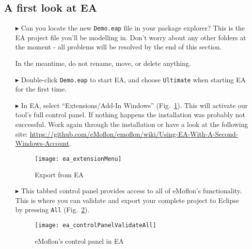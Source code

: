 \clearpage
\genHeader

\subsection{A first look at EA}

\begin{itemize}
\FloatBarrier
\hypertarget{simpleDemo vis}{}
\item[$\blacktriangleright$] Can you locate the new \texttt{Demo.eap} file in your package explorer? This is the EA project file you'll be
modelling in. Don't worry about any other folders at the moment - all problems will be resolved by the end of this section.

In the meantime, do not rename, move, or delete anything.

\item[$\blacktriangleright$] Double-click \texttt{Demo.eap} to start EA, and choose \texttt{Ultimate} when starting EA for the first time.

\item[$\blacktriangleright$] In EA, select ``Extensions/Add-In Windows'' (Fig.~\ref{ea:validate_dropdown}). This will activate our tool's full
control panel. If nothing happens the installation was probably not successful. Work again through the installation or have a look at the following site:
\newline
\href{https://github.com/eMoflon/emoflon/wiki/Using-EA-With-A-Second-Windows-Account}{https://github.com/eMoflon/emoflon/wiki/Using-EA-With-A-Second-Windows-Account}.

\vspace{0.5cm}

\begin{figure}[htbp]
	\centering
  \texttt{[image: ea\_extensionMenu]}
	\caption{Export from EA} 
	\label{ea:validate_dropdown} 
\end{figure}

\item[$\blacktriangleright$] This tabbed control panel provides access to all of
eMoflon's functionality. This is where you can validate and export your complete project to Eclipse by pressing \texttt{All} (Fig.~\ref{ea:controlPanel}).

\begin{figure}[htbp]
	\centering
  \texttt{[image: ea\_controlPanelValidateAll]}
	\caption{eMoflon's control panel in EA} 
	\label{ea:controlPanel} 
\end{figure}


\end{itemize}
